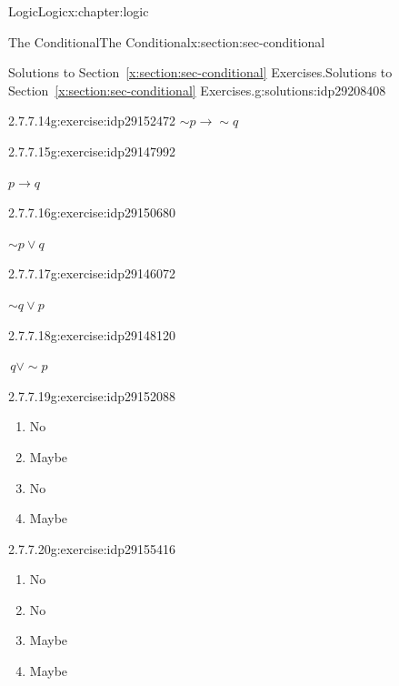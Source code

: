 \documentclass[twoside,10pt,]{book}
\newcommand{\xreffont}{\relax}
\numberwithin{equation}{section}
\newcommand{\conditional}{{p {\rightarrow} q}}
\newcommand{\inverse}{{\sim\!{p}{} {\rightarrow} \sim\!{q}{}}}
\begin{document}
\begin{chapterptx}{Logic}{}{Logic}{}{}{x:chapter:logic}
\begin{sectionptx}{The Conditional}{}{The Conditional}{}{}{x:section:sec-conditional}
\begin{solutions-subsection}{Solutions to Section~{\xreffont\ref*{x:section:sec-conditional}} Exercises.}{}{Solutions to Section~{\xreffont\ref*{x:section:sec-conditional}} Exercises.}{}{}{g:solutions:idp29208408}
\begin{exercisegroup}
\begin{divisionsolutioneg}{2.7.7.14}{}{g:exercise:idp29152472}
\noindent\hypertarget{g:solution:idp29150168-main}{}\(\inverse\)\end{divisionsolutioneg}%
\begin{divisionsolutioneg}{2.7.7.15}{}{g:exercise:idp29147992}%
\par\smallskip%
\noindent\hypertarget{g:solution:idp29148504-main}{}\(\conditional\)\end{divisionsolutioneg}%
\begin{divisionsolutioneg}{2.7.7.16}{}{g:exercise:idp29150680}%
\par\smallskip%
\noindent\hypertarget{g:solution:idp29149016-main}{}\(\sim\!{p}{}{\vee} q \)\end{divisionsolutioneg}%
\begin{divisionsolutioneg}{2.7.7.17}{}{g:exercise:idp29146072}%
\par\smallskip%
\noindent\hypertarget{g:solution:idp29151832-main}{}\(\sim\!{q}{\vee} p\)\end{divisionsolutioneg}%
\begin{divisionsolutioneg}{2.7.7.18}{}{g:exercise:idp29148120}%
\par\smallskip%
\noindent\hypertarget{g:solution:idp29150040-main}{}\(\, q{\vee}\sim\!{p}{}\)\end{divisionsolutioneg}%
\end{exercisegroup}
\par\medskip\noindent
\begin{divisionsolution}{2.7.7.19}{}{g:exercise:idp29152088}%
\par\smallskip%
\noindent\hypertarget{g:solution:idp29159640-main}{}%
\begin{enumerate}[label=(\alph*)]
\item{}No%
\item{}Maybe%
\item{}No%
\item{}Maybe%
\end{enumerate}
\end{divisionsolution}%
\begin{divisionsolution}{2.7.7.20}{}{g:exercise:idp29155416}%
\par\smallskip%
\noindent\hypertarget{g:solution:idp29157080-main}{}%
\begin{enumerate}[label=(\alph*)]
\item{}No%
\item{}No%
\item{}Maybe%
\item{}Maybe%
\end{enumerate}

\end{divisionsolution}
\end{solutions-subsection}
\end{sectionptx}
\end{chapterptx}
\end{document}
